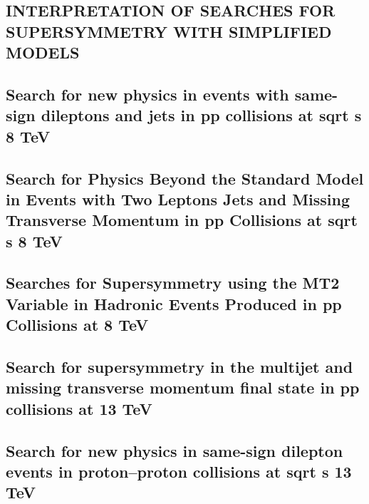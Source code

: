 \documentclass[a4paper, 11pt, twoside, openright]{report}
\begin{document}
\subsection{INTERPRETATION OF SEARCHES FOR SUPERSYMMETRY WITH SIMPLIFIED MODELS}


\subsection{Search for new physics in events with same-sign dileptons and jets in pp collisions at sqrt s 8 TeV}


\subsection{Search for Physics Beyond the Standard Model in Events with Two Leptons Jets and Missing Transverse Momentum in pp Collisions at sqrt s 8 TeV}


\subsection{Searches for Supersymmetry using the MT2 Variable in Hadronic Events Produced in pp Collisions at 8 TeV}


\subsection{Search for supersymmetry in the multijet and missing transverse momentum final state in pp collisions at 13 TeV}


\subsection{Search for new physics in same-sign dilepton events in proton–proton collisions at sqrt s 13 TeV}

\end{document}
